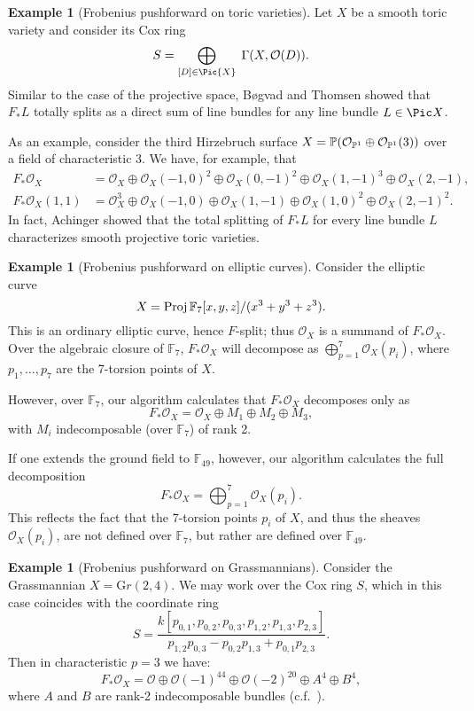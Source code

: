 \documentclass[12pt]{article}
\def\OO{\mathcal O}
\def\FF{\mathbb F}
\def\Gr{\mathrm Gr}
\theoremstyle{theorem}
\numberwithin{thm}{section}
\theoremstyle{definition}
\newtheorem{exa}[thm]{Example}
\begin{document}
\begin{exa}[Frobenius pushforward on toric varieties]
  Let $X$ be a smooth toric variety and consider its Cox ring
  \[ S = \bigoplus_{[D]\in\Pic{X}} \; \Gamma(X, \OO(D)). \]
  Similar to the case of the projective space, B{\o}gvad and Thomsen \cite{Bogvad98,Thomsen00} showed that $F_*L$ totally splits as a direct sum of line bundles for any line bundle $L\in\Pic X$.

  As an example, consider the third Hirzebruch surface $X=\P(\OO_{\P^1}\oplus \OO_{\P^1}(3))$ over a field of characteristic 3. We have, for example, that
  \begin{align*}
    F_*\OO_X      &= \OO_X   \oplus \OO_X(-1,0)^2 \oplus \OO_X(0,-1)^2 \oplus \OO_X(1,-1)^3 \oplus \OO_X(2,-1), \\
    F_*\OO_X(1,1) &= \OO_X^3 \oplus \OO_X(-1,0)   \oplus \OO_X(1,-1)   \oplus \OO_X(1, 0)^2 \oplus \OO_X(2,-1)^2.
  \end{align*}
  In fact, Achinger \cite{Achinger15} showed that the total splitting of $F_*L$ for every line bundle $L$ characterizes smooth projective toric varieties.
\end{exa}

\begin{exa}[Frobenius pushforward on elliptic curves]\label{algclos}
  Consider the elliptic curve
  \[ X = \Proj \FF_7[x,y,z]/(x^3+y^3+z^3). \]
  This is an ordinary elliptic curve, hence $F$-split; thus $\OO_X$ is a summand of $F_* \OO_X$. Over the algebraic closure of $\FF_7$, $F_*\OO_X$ will decompose as $\bigoplus_{p=1}^7 \OO_X(p_i)$, where $p_1,\dots,p_7$ are the 7-torsion points of $X$.

  However, over $\FF_7$, our algorithm calculates that $F_*\OO_X$ decomposes only as
  $$ F_* \OO_X =\OO_X \oplus M_1\oplus M_2\oplus M_3, $$
  with $M_i$ indecomposable (over $\FF_7$) of rank 2.

  If one extends the ground field to $\FF_{49}$, however, our algorithm calculates the full decomposition
  $$ F_* \OO_X=\bigoplus_{p=1}^7 \OO_X(p_i). $$
  This reflects the fact that the 7-torsion points $p_i$ of $X$, and thus the sheaves $\OO_X(p_i)$, are not defined over $\FF_7$, but rather are defined over $\FF_{49}$.
\end{exa}

\begin{exa}[Frobenius pushforward on Grassmannians]
  Consider the Grassmannian $X = \Gr(2,4)$. We may work over the Cox ring $S$,
  which in this case coincides with the coordinate ring
  \[ S = \frac{k[p_{0,1},p_{0,2},p_{0,3},p_{1,2},p_{1,3},p_{2,3}]}{p_{1,2}p_{0,3}-p_{0,2}p_{1,3}+p_{0,1}p_{2,3}}. \]
  Then in characteristic $p=3$ we have:
  \[ F_*\OO_X = \OO \oplus \OO(-1)^{44} \oplus \OO(-2)^{20} \oplus A^4 \oplus B^4, \]
  where $A$ and $B$ are rank-2 indecomposable bundles (c.f.~\cite{RSVdB22}).
\end{exa}
\end{document}
